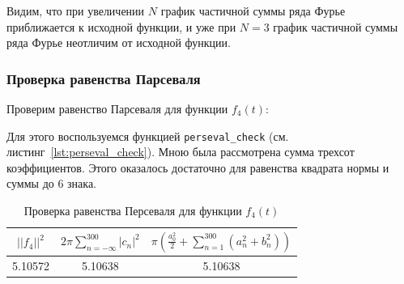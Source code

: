Видим, что при увеличении $N$ график частичной суммы ряда Фурье приближается к исходной функции, и уже при $N = 3$ график частичной суммы ряда Фурье неотличим от исходной функции.

\FloatBarrier
\subsubsection{Проверка равенства Парсеваля}

Проверим равенство Парсеваля для функции $f_4(t)$:

Для этого воспользуемся функцией \texttt{perseval\_check} (см. листинг~\ref{lst:perseval_check}).
Мною была рассмотрена сумма трехсот коэффициентов. Этого оказалось достаточно для равенства квадрата нормы и суммы до 6 знака. 

\begin{table}[ht!]
    \centering
    \begin{tabular}{|c|c|c|}
        \hline
        $||f_4||^2$ & $2\pi \sum\limits_{n = -\infty}^{300} |c_n|^2$ & $\pi \left(\frac{a_0^2}{2} + \sum\limits_{n = 1}^{300} (a_n^2 + b_n^2)\right)$\\
        \hline
        5.10572 & 5.10638 & 5.10638 \\
        \hline
    \end{tabular}
    \caption{Проверка равенства Персеваля для функции $f_4(t)$}
    \label{tab:func_4_pers}
\end{table}